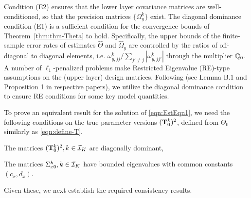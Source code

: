 {\colb
Condition (E2) ensures that the lower layer covariance matrices are well-conditioned, so that the precision matrices $\{ \Omega_y^k \}$ exist. The diagonal dominance condition (E1) is a sufficient condition for the convergence bounds of Theorem~\ref{thm:thm-Theta} to hold. Specifically, the upper bounds of the finite-sample error rates of estimates $\widehat \Theta$ and $\widehat \Omega_y$ are controlled by the ratios of off-diagonal to diagonal elements, i.e. $\omega_{y,jj}^k/\sum_{j' \neq j} | \omega_{y,jj'}^k| $ through the multiplier ${\mathbb{Q}}_0$. A number of $\ell_1$-penalized problems make Restricted Eigenvalue (RE)-type assumptions \citep{BickelRitovTsybakov09,LohWainwright12,LinEtal16} on the (upper layer) design matrices. Following \citet{BasuMichailidis15,LinEtal16} (see Lemma B.1 and Proposition 1 in respective papers), we utilize the diagonal dominance condition to ensure RE conditions for some key model quantities.
}

To prove an equivalent result for the solution of \eqref{eqn:EstEqn1}, we need the following conditions on the true parameter versions $({\mathbf{T}}_0^k)^2$, defined from $\Theta_0$ similarly as \eqref{eqn:define-T}.

\vspace{1em}
 The matrices $({\mathbf{T}}_0^k)^2, k \in {\cal{I}}_K$ are diagonally dominant,

 The matrices $\Sigma_{x0}^k, k \in {\cal{I}}_K$ have bounded eigenvalues with common constants $(c_x, d_x)$.
\vspace{1em}
%

\noindent Given these, we next establish the required consistency results.

